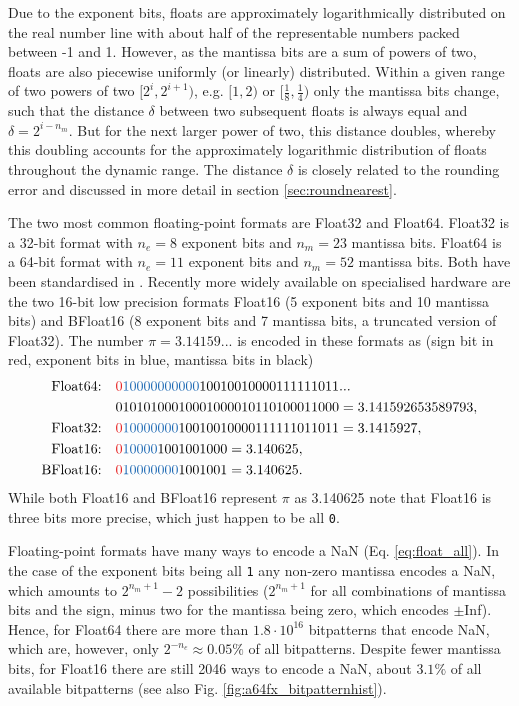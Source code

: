 Due to the exponent bits, floats are approximately logarithmically distributed on the real number line with about half of the representable
numbers packed between -1 and 1. However, as the mantissa bits are a sum of powers of two, floats
are also piecewise uniformly (or linearly) distributed. Within a given range of two powers of two $[2^i,2^{i+1})$, e.g. $[1,2)$ or
$[\tfrac{1}{8},\tfrac{1}{4})$ only the mantissa bits change, such that the distance $\delta$ between two subsequent 
floats is always equal and $\delta = 2^{i-n_m}$. But for the next larger power of two, this distance doubles, whereby
this doubling accounts for the approximately logarithmic distribution of floats throughout the dynamic range. The distance $\delta$ is
closely related to the rounding error and discussed in more detail in section \ref{sec:roundnearest}.

The two most common floating-point formats are Float32 and Float64. Float32 is a 32-bit format with $n_e=8$ exponent bits and
$n_m=23$ mantissa bits. Float64 is a 64-bit format with $n_e=11$ exponent bits and $n_m=52$ mantissa bits. Both have been 
standardised in \cite{IEEE1985}. Recently more widely available on specialised hardware are the two 16-bit low precision formats
Float16 (5 exponent bits and 10 mantissa bits) and BFloat16 (8 exponent bits and 7 mantissa bits, a truncated version of Float32).
The number $\pi = 3.14159...$ is encoded in these formats as (sign bit in red, exponent bits in blue, mantissa bits in black)
\begin{align}
\text{Float64:}& \quad {\color{psign}0}{\color{pexpo}10000000000}10010010000111111011... \nonumber \\
			& \quad 01010100010001000010110100011000 = 3.141592653589793, \nonumber \\
\text{Float32:}& \quad {\color{psign}0}{\color{pexpo}10000000}10010010000111111011011 = 3.1415927, \nonumber \\
\text{Float16:}& \quad {\color{psign}0}{\color{pexpo}10000}1001001000 = 3.140625, \nonumber \\
\text{BFloat16:}& \quad {\color{psign}0}{\color{pexpo}10000000}1001001 = 3.140625.
\end{align}
While both Float16 and BFloat16 represent $\pi$ as 3.140625 note that Float16 is three bits more precise, which just happen to be all \texttt{0}.

Floating-point formats have many ways to encode a NaN (Eq. \ref{eq:float_all}). In the case of the exponent bits being all \texttt{1} any non-zero
mantissa encodes a NaN, which amounts to $2^{n_m+1}-2$ possibilities ($2^{n_m+1}$ for all combinations of mantissa bits and the sign,
minus two for the mantissa being zero, which encodes $\pm$Inf). Hence, for Float64 there are more than $1.8 \cdot 10^{16}$ bitpatterns
that encode NaN, which are, however, only $2^{-n_e} \approx 0.05\%$ of all bitpatterns. Despite fewer mantissa bits, for Float16 there are
still 2046 ways to encode a NaN, about $3.1\%$ of all available bitpatterns (see also Fig. \ref{fig:a64fx_bitpatternhist}).


